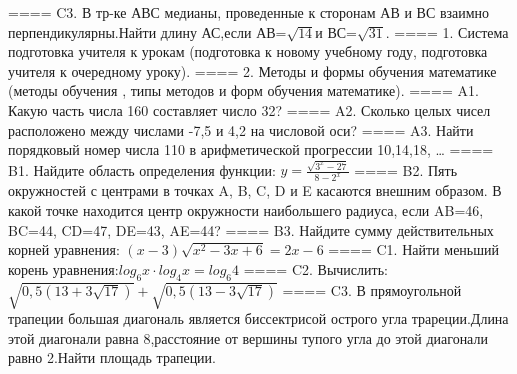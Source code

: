 ====
C3. В тр-ке АВС медианы, проведенные к сторонам АВ и ВС взаимно перпендикулярны.Найти длину АС,если АВ=\(\sqrt{14}\)и ВС=\(\sqrt{31}\).
====
1. Система подготовка учителя к урокам (подготовка к новому учебному году, подготовка учителя к очередному уроку).
====
2. Методы и формы обучения математике (методы обучения , типы методов и форм обучения математике).
====
A1. Какую часть числа 160 составляет число 32?
====
A2. Сколько целых чисел расположено между числами -7,5 и 4,2 на числовой оси?
====
A3. Найти порядковый номер числа 110 в арифметической прогрессии 10,14,18, \ldots{}
====
B1. Найдите область определения функции: \(y = \frac{\sqrt{3^{x} - 27}}{8 - 2^{x}}\)
====
B2. Пять окружностей с центрами в точках A, B, C, D и E касаются внешним образом. В какой точке находится центр окружности наибольшего радиуса, если AB=46, BC=44, CD=47, DE=43, AE=44?
====
B3. Найдите сумму действительных корней уравнения: \((x - 3)\sqrt{x^{2} - 3x + 6} = 2x - 6\)
====
C1. Найти меньший корень уравнения:\(log_{6}x \cdot log_{4}x = log_{6}4\)
====
C2. Вычислить:\(\sqrt{0,5(13 + 3\sqrt{17})} + \sqrt{0,5(13 - 3\sqrt{17})}\)
====
C3. В прямоугольной трапеции большая диагональ является биссектрисой острого угла трареции.Длина этой диагонали равна 8,расстояние от вершины тупого угла до этой диагонали равно 2.Найти площадь трапеции.